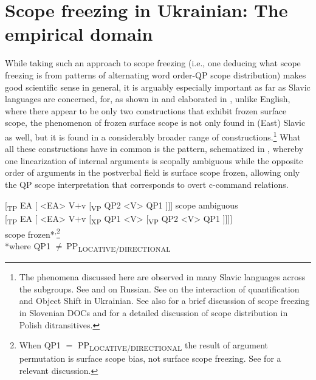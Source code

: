 \documentclass[output=paper,colorlinks,citecolor=brown]{langscibook}
\begin{document}
\section{Scope freezing in Ukrainian: The empirical domain}\label{sec:antonyuk:2}

While taking such an approach to scope freezing (i.e., one deducing what scope freezing is from patterns of alternating word order-QP scope distribution) makes good scientific sense in general, it is arguably especially important as far as Slavic languages are concerned, for, as shown in \citet{Antonyuk2015} and elaborated in \citet{Antonyuk2023,AntonyukUnderReview}, unlike English, where there appear to be only two constructions that exhibit frozen surface scope, the phenomenon of frozen surface scope is not only found in (East) Slavic as well, but it is found in a considerably broader range of constructions.\footnote{ \textrm{The phenomena discussed here are observed in many Slavic languages across the subgroups. See \citet{Antonyuk2015, Antonyuk2020,Antonyuk2023} and \citet{BonehNash2017} on Russian. See \citet{AntonyukMykhaylyk2022} on the interaction of quantification and Object Shift in Ukrainian. See also \citet{MarvinStegovec2012} for a brief discussion of scope freezing in Slovenian DOCs and \citet{AbelsGrabska2022} for a detailed discussion of scope distribution in Polish ditransitives.} } What all these constructions have in common is the pattern, schematized in , whereby one linearization of internal arguments is scopally ambiguous while the opposite order of arguments in the postverbal field is surface scope frozen, allowing only the QP scope interpretation that corresponds to overt c-command relations. 

\ea%
    \label{ex:antonyuk:6}

  \ea{}  [\textsubscript{TP} EA [ <EA>  V$+$v  [\textsubscript{VP} QP2  <V>  QP1 ]]]      \hfill scope ambiguous\\
\ex{} [\textsubscript{TP} EA [ <EA>  V$+$v [\textsubscript{XP} QP1  <V> [\textsubscript{VP} QP2  <V>  QP1 ]]]] \\  \hfill scope frozen*\textsuperscript{,}\footnote{\textrm{When QP1 $=$ PP}\textrm{\textsubscript{LOCATIVE/DIRECTIONAL} }\textrm{the result of argument permutation is surface scope bias, not surface scope freezing. See \citet{Antonyuk2020, AntonyukUnderReview} for a relevant discussion.} }\\
*where QP1 ${\neq}~$PP\textsubscript{LOCATIVE/DIRECTIONAL}
\z
\z
\end{document}
